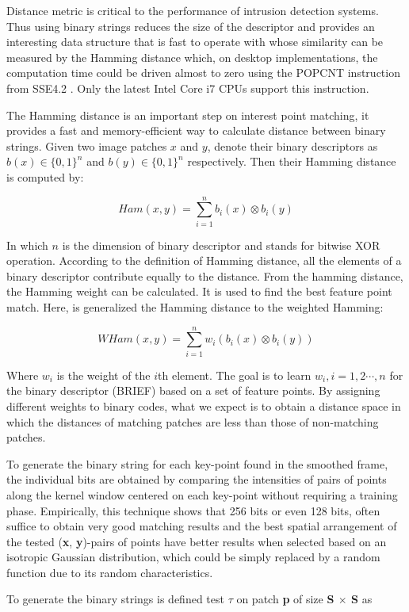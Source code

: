 Distance metric is critical to the performance of intrusion detection systems. Thus using binary strings reduces the size of the descriptor and provides an interesting data structure that is fast to operate with whose similarity can be measured by the Hamming distance which, on desktop implementations, the computation time could be driven almost to zero using the POPCNT instruction from SSE4.2 \cite{Intel2007}. Only the latest Intel Core i7 CPUs support this instruction.

The Hamming distance is an important step on interest point matching, it provides a fast and memory-efficient way to calculate distance between binary strings. Given two image patches $x$ and $y$, denote their binary descriptors as $b(x) \in \{0,1\}^n$ and $b(y) \in \{0,1\}^n$ respectively. Then their Hamming distance is computed by:

$$Ham(x, y)=\sum_{i=1}^{n}b_i(x)\otimes b_i(y)$$

In which $n$ is the dimension of binary descriptor and stands for bitwise XOR operation. According to the definition of Hamming distance, all the elements of a binary descriptor contribute equally to the distance. From the hamming distance, the Hamming weight can be calculated. It is used to find the best feature point match. Here, is generalized the Hamming distance to the weighted Hamming:

$$WHam(x, y)=\sum_{i=1}^{n}w_i(b_i(x)\otimes b_i(y))$$

Where $w_i$ is the weight of the $i$th element. The goal is to learn $w_i,i=1,2\cdots,n$ for the binary descriptor (BRIEF) based on a set of feature points. By assigning different weights to binary codes, what we expect is to obtain a distance space in which the distances of matching patches are less than those of non-matching patches.

To generate the binary string for each key-point found in the smoothed frame, the individual bits are obtained by comparing the intensities of pairs of points along the kernel window centered on each key-point without requiring a training phase. Empirically, this technique shows that 256 bits or even 128 bits, often suffice to obtain very good matching results and the best spatial arrangement of the tested (\textbf{x}, \textbf{y})-pairs of points have better results when selected based on an isotropic Gaussian distribution, which could be simply replaced by a random function due to its random characteristics.

To generate the binary strings is defined test $\tau$ on patch \textbf{p} of size \textbf{S $\times$ S} as

